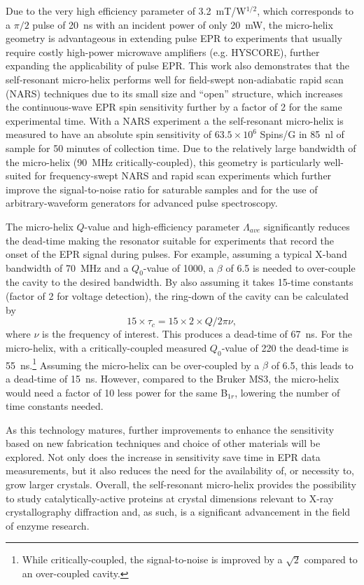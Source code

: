Due to the very high efficiency parameter of 3.2~mT/W$^{1/2}$, which corresponds to a $\pi/2$ pulse of 20~ns with an incident power of only 20~mW, the micro-helix geometry is advantageous in extending pulse EPR to experiments that usually require costly high-power microwave amplifiers (e.g. HYSCORE), further expanding the applicability of pulse EPR. This work also demonstrates that the self-resonant micro-helix performs well for field-swept non-adiabatic rapid scan (NARS) techniques due to its small size and ``open'' structure, which increases the continuous-wave EPR spin sensitivity further by a factor of 2 for the same experimental time. With a NARS experiment a the  self-resonant micro-helix is measured to have an absolute spin sensitivity of $63.5 \times 10^6$ Spins/G in 85~nl of sample for 50 minutes of collection time. Due to the relatively large bandwidth of the micro-helix (90~MHz critically-coupled), this geometry is particularly well-suited for frequency-swept NARS and rapid scan experiments which further improve the signal-to-noise ratio for saturable samples\cite{Hyde2013MDIFF, MOSER2017} and for the use of arbitrary-waveform generators for advanced pulse spectroscopy. \cite{schweiger2001principles, chirpedESEEM, goldfarb2018epr}

The micro-helix $Q$-value and high-efficiency parameter $\Lambda_{ave}$ significantly reduces the dead-time making the resonator suitable for experiments that record the onset of the EPR signal during pulses. For example, assuming a typical X-band bandwidth of 70~MHz and a $Q_0$-value of 1000, a $\beta$ of 6.5 is needed to over-couple the cavity to the desired bandwidth. By also assuming it takes 15-time constants (factor of 2 for voltage detection), the ring-down of the cavity can be calculated by
\begin{equation}
    15 \times \tau_c = 15 \times 2 \times Q / 2 \pi \nu,
\end{equation}
where $\nu$ is the frequency of interest. This produces a dead-time of 67~ns. For the micro-helix, with a critically-coupled measured $Q_0$-value of 220 the dead-time is 55~ns.\footnote{While critically-coupled, the signal-to-noise is improved by a $\sqrt{2}$ compared to an over-coupled cavity.} Assuming the micro-helix can be over-coupled by a $\beta$ of 6.5, this leads to a dead-time of 15~ns. However, compared to the Bruker MS3, the micro-helix would need a factor of 10 less power for the same B$_{1r}$, lowering the number of time constants needed.

As this technology matures, further improvements to enhance the sensitivity based on new fabrication techniques and choice of other materials will be explored. Not only does the increase in sensitivity save time in EPR data measurements, but it also reduces the need for the availability of, or necessity to, grow larger crystals. Overall, the self-resonant micro-helix provides the possibility to study catalytically-active proteins at crystal dimensions relevant to X-ray crystallography diffraction and, as such, is a significant advancement in the field of enzyme research. 

{\renewcommand{\bibsection}{\clearpage\section*{\bibname}\markboth{\bibname}{\bibname}}
\renewcommand{\bibname}{CHAPTER 5. REFERENCES}


}
